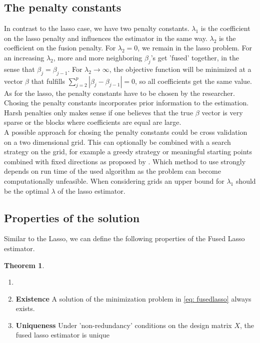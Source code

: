 \documentclass{article}
\theoremstyle{definition}
\newtheorem{theorem}{Theorem}
\begin{document}
\subsection{The penalty constants} \label{subsec: penalties}
In contrast to the lasso case, we have two penalty constants. $\lambda_1$ is the coefficient on the lasso penalty and influences the estimator in the same way. $\lambda_2$ is the coefficient on the fusion penalty.  For $\lambda_2=0$, we remain in the lasso problem. For an increasing $\lambda_2$, more and more neighboring $\beta_j$'s get 'fused' together, in the sense that $\beta_j=\beta_{j-1}$. For $\lambda_2\to\infty$, the objective function will be minimized at a vector $\beta$ that fulfills $\sum_{j=2}^p|\beta_j- \beta_{j-1}|=0$, so all coefficients get the same value.\\
As for the lasso, the penalty constants have to be chosen by the researcher.
Chosing the penalty constants incorporates prior information to the estimation. Harsh penalties only makes sense if one believes that the true $\beta$ vector is very sparse or the blocks where coefficients are equal are large. \\
A possible approach for chosing the penalty constants could be cross validation on a two dimensional grid. This can optionally be combined with a search strategy on the grid, for example a greedy strategy or meaningful starting points combined with fixed directions as proposed by \citep{fused}. Which method to use strongly depends on run time of the used algorithm as the problem can become computationally unfeasible. 
When considering grids an upper bound for $\lambda_1$ should be the optimal $\lambda$ of the lasso estimator.

\subsection{Properties of the solution}

Similar to the Lasso, we can define the following properties of the Fused Lasso estimator.

\begin{theorem}
	\begin{enumerate}
		\item[]
		\item \textbf{Existence} A solution of the minimization problem in \ref{eq: fusedlasso} always exists.
		\item \textbf{Uniqueness} Under 'non-redundancy' conditions on the design matrix $X$, the fused lasso estimator is unique 
	\end{enumerate}
\end{theorem}
\end{document}
